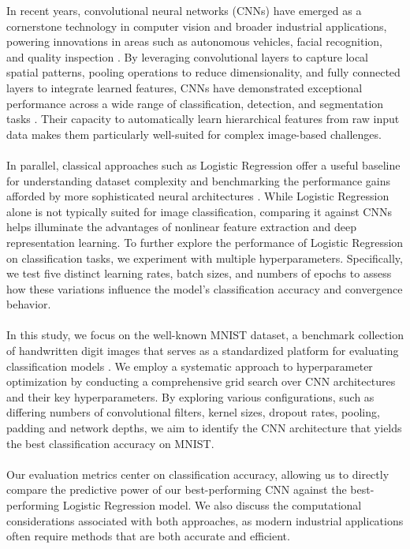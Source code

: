 In recent years, convolutional neural networks (CNNs) have emerged as a cornerstone technology in computer vision and broader industrial applications, powering innovations in areas such as autonomous vehicles, facial recognition, and quality inspection \cite{lecun2015deep, krizhevsky2012imagenet}. By leveraging convolutional layers to capture local spatial patterns, pooling operations to reduce dimensionality, and fully connected layers to integrate learned features, CNNs have demonstrated exceptional performance across a wide range of classification, detection, and segmentation tasks \cite{he2016deep}. Their capacity to automatically learn hierarchical features from raw input data makes them particularly well-suited for complex image-based challenges.
\\
\\
In parallel, classical approaches such as Logistic Regression offer a useful baseline for understanding dataset complexity and benchmarking the performance gains afforded by more sophisticated neural architectures \cite{hastie2009elements}. While Logistic Regression alone is not typically suited for image classification, comparing it against CNNs helps illuminate the advantages of nonlinear feature extraction and deep representation learning. To further explore the performance of Logistic Regression on classification tasks, we experiment with multiple hyperparameters. Specifically, we test five distinct learning rates, batch sizes, and numbers of epochs to assess how these variations influence the model's classification accuracy and convergence behavior.
\\
\\
In this study, we focus on the well-known MNIST dataset, a benchmark collection of handwritten digit images that serves as a standardized platform for evaluating classification models \cite{lecun1998gradient}. We employ a systematic approach to hyperparameter optimization by conducting a comprehensive grid search over CNN architectures and their key hyperparameters. By exploring various configurations, such as differing numbers of convolutional filters, kernel sizes, dropout rates, pooling, padding and network depths, we aim to identify the CNN architecture that yields the best classification accuracy on MNIST.
\\
\\
Our evaluation metrics center on classification accuracy, allowing us to directly compare the predictive power of our best-performing CNN against the best-performing Logistic Regression model. We also discuss the computational considerations associated with both approaches, as modern industrial applications often require methods that are both accurate and efficient.
